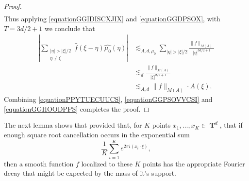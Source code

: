 \documentclass[12pt,reqno]{article}
\numberwithin{equation}{section}
\DeclareMathOperator{\TT}{\mathbf{T}}
\begin{document}
\begin{proof}
\begin{equation}
\begin{split}
    \end{split}
    \end{equation}
    Thus applying \eqref{equationGGIDISCXJIX} and \eqref{equationGGDPSOX}, with $T = 3d/2 + 1$ we conclude that
    \begin{equation} \label{equationGGHOODPPS}
    \begin{split}
        \left| \sum_{\substack{|\eta| > |\xi|/2\\ \eta \neq \xi}} \widehat{f}(\xi - \eta) \widehat{\mu_0}(\eta) \right| &\lesssim_{A,d,\mu_0} \sum_{|\eta| > |\xi|/2} \frac{\| f \|_{M(A)}}{|\eta|^{3d/2+1}}\\
        &\lesssim_d \frac{\| f \|_{M(A)}}{|\xi|^{d/2 + 1}}\\
        &\lesssim_{A,d} \| f \|_{M(A)} \cdot A(\xi). 
    \end{split}
    \end{equation}
    Combining \eqref{equationPPYTUECUUCS}, \eqref{equationGGPSOVVCSI} and \eqref{equationGGHOODPPS} completes the proof.
\end{proof}

The next lemma shows that provided that, for $K$ points $x_1, \dots, x_K \in \TT^d$, that if enough square root cancellation occurs in the exponential sum
%
\[ \frac{1}{K} \sum_{i = 1}^K e^{2 \pi i (x_i \cdot \xi)}, \]
%
then a smooth function $f$ localized to these $K$ points has the appropriate Fourier decay that might be expected by the mass of it's support.
\end{document}
